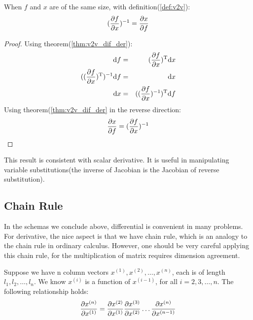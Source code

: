 \begin{mythm}
	When $f$ and $x$ are of the same size, with definition(\ref{def:v2v}):
	\begin{equation}
		(\dfrac{\partial f}{\partial x})^{-1} = \dfrac{\partial x}{\partial f}
	\end{equation}	 
\end{mythm}
\begin{proof}
	Using theorem(\ref{thm:v2v_dif_der}):
	\begin{eqnarray}
		\mathrm{d}f  &=& (\dfrac{\partial f}{\partial x})^\mathrm{T}\mathrm{d}x \\
		((\dfrac{\partial f}{\partial x})^\mathrm{T})^{-1} \mathrm{d}f  &=& \mathrm{d}x \\
		\mathrm{d}x  &=& ((\dfrac{\partial f}{\partial x})^{-1})^\mathrm{T} \mathrm{d}f\\
	\end{eqnarray}
	Using theorem(\ref{thm:v2v_dif_der} in the reverse direction:
	\begin{equation}
		\dfrac{\partial x}{\partial f} = (\dfrac{\partial f}{\partial x})^{-1}
	\end{equation}
\end{proof}
This result is consistent with scalar derivative. It is useful 
in manipulating variable substitutions(the inverse of Jacobian 
is the Jacobian of reverse substitution). 


\subsection{Chain Rule}

In the schemas we conclude above, differential is convenient in 
many problems. For derivative, the nice aspect is that we have chain rule, 
which is an analogy to the chain rule in ordinary calculus. However, 
one should be very careful applying this chain rule, for the multiplication 
of matrix requires dimension agreement. 

\begin{mythm}
Suppose we have n column vectors $x^{(1)},x^{(2)},\ldots, x^{(n)}$, each 
is of length $l_1, l_2, \ldots, l_n$. We know $x^{(i)}$ is a function 
of $x^{(i-1)}$, for all $i=2, 3, \dots, n$. The following relationship 
holds:
\begin{equation}
	\dfrac{\partial x^{(n)}}{\partial x^{(1)}} = \dfrac{\partial x^{(2)}}{\partial x^{(1)}}
	\dfrac{\partial x^{(3)}}{\partial x^{(2)}} \ldots \dfrac{\partial x^{(n)}}{\partial x^{(n-1)}}
\end{equation}
\end{mythm}

